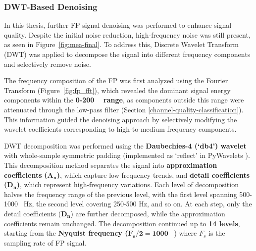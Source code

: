 \documentclass{report}
\begin{document}
    \subsubsection{DWT-Based Denoising}
    
        In this thesis, further FP signal denoising was performed to enhance signal quality. Despite the initial noise reduction, high-frequency noise was still present, as seen in Figure~\ref{fig:mea-final}. To address this, Discrete Wavelet Transform (DWT) \cite{DWTWiki} was applied to decompose the signal into different frequency components and selectively remove noise.
    
            The frequency composition of the FP was first analyzed using the Fourier Transform (Figure~\ref{fig:fp_fft}), which revealed the dominant signal energy components within the \textbf{0-200 \SI{}{\textbf{\hertz}} range}, as components outside this range were attenuated through the low-pass filter (Section \ref{channel-quality-classification}). This information guided the denoising approach by selectively modifying the wavelet coefficients corresponding to high-to-medium frequency components.
            
            DWT decomposition was performed using the \textbf{Daubechies-4 (`db4') wavelet} with whole-sample symmetric padding (implemented as `reflect' in PyWavelets \cite{Lee2019}). This decomposition method separates the signal into \textbf{approximation coefficients} \textbf{(\(\bm{A_n}\))}, which capture low-frequency trends, and \textbf{detail coefficients} \textbf{(\(\bm{D_n}\))}, which represent high-frequency variations. Each level of decomposition halves the frequency range of the previous level, with the first level spanning 500-1000 \SI{}{\hertz}, the second level covering 250-500 Hz, and so on. At each step, only the detail coefficients (\(\bm{D_n}\)) are further decomposed, while the approximation coefficients remain unchanged. The decomposition continued up to \textbf{14 levels}, starting from the \textbf{Nyquist frequency (}\(\bm{F_s/2 = 1000}\) \SI{}{\textbf{\hertz}}) where $F_s$ is the sampling rate of FP signal. 
            
\end{document}
